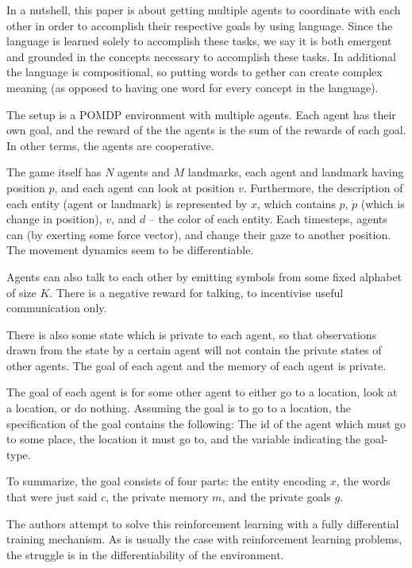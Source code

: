 \documentclass[12pt]{article}
\begin{document}
In a nutshell, this paper is about getting multiple agents to coordinate with each other in order to accomplish their respective goals by using language. Since the language is learned solely to accomplish these tasks, we say it is both emergent and grounded in the concepts necessary to accomplish these tasks. In additional the language is compositional, so putting words to gether can create complex meaning (as opposed to having one word for every concept in the language).

The setup is a POMDP environment with multiple agents. Each agent has their own goal, and the reward of the the agents is the sum of the rewards of each goal. In other terms, the agents are cooperative.

The game itself has $N$ agents and $M$ landmarks, each agent and landmark having position $p$, and each agent can look at position $v$. Furthermore, the description of each entity (agent or landmark) is represented by $x$, which contains $p$, $\dot p$ (which is change in position), $v$, and $d$ -- the color of each entity. Each timesteps, agents can (by exerting some force vector), and change their gaze to another position. The movement dynamics seem to be differentiable.

Agents can also talk to each other by emitting symbols from some fixed alphabet of size $K$. There is a negative reward for talking, to incentivise useful communication only.

There is also some state which is private to each agent, so that observations drawn from the state by a certain agent will not contain the private states of other agents. The goal of each agent and the memory of each agent is private.

The goal of each agent is for some other agent to either go to a location, look at a location, or do nothing. Assuming the goal is to go to a location, the specification of the goal contains the following: The id of the agent which must go to some place, the location it must go to, and the variable indicating the goal-type.

To summarize, the goal consists of four parts: the entity encoding $x$, the words that were just said $c$, the private memory $m$, and the private goals $g$. 

The authors attempt to solve this reinforcement learning with a fully differential training mechanism. As is usually the case with reinforcement learning problems, the struggle is in the differentiability of the environment.
\end{document}
